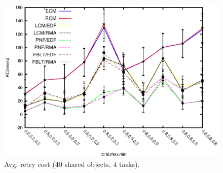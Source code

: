 \documentclass[prodmode,acmtecs]{acmsmall}
\begin{document}
\begin{compactenum}
\begin{figure}
\centering
\includegraphics[scale=0.8]{figures/Abr_dur_4t_100obj_100wr_-1eta}
\caption{Avg. retry cost (40 shared objects, 4 tasks).}
\label{fig-RC-pnf-4t-40obj}
\end{figure}


\end{compactenum}
\end{document}
